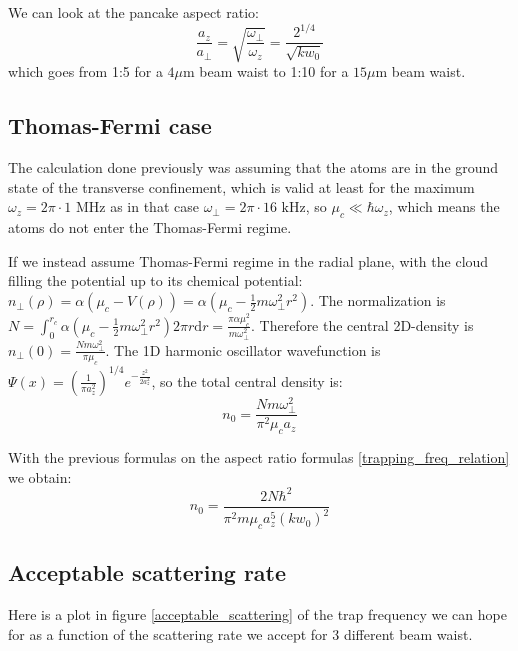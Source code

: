 \documentclass[reprint,amsmath,amssymb,aps,nofootinbib]{revtex4-1}
\begin{document}
We can look at the pancake aspect ratio:
\begin{equation}
\frac{a_{z}}{a_{\perp}}=\sqrt{\frac{\omega_{\perp}}{\omega_{z}}} = \frac{2^{1/4}}{\sqrt{kw_{0}}}
\end{equation}
which goes from 1:5 for a $4\mu$m beam waist to 1:10 for a $15\mu$m beam waist.

\subsection{Thomas-Fermi case}

The calculation done previously was assuming that the atoms are in the ground state of the transverse confinement, which is valid at least for the maximum $\omega_{z} = 2\pi\cdot 1\text{ MHz}$ as in that case $\omega_{\perp} = 2\pi\cdot 16\text{ kHz}$, so $\mu_{c} \ll \hbar\omega_{z}$, which means the atoms do not enter the Thomas-Fermi regime.

If we instead assume Thomas-Fermi regime in the radial plane, with the cloud filling the potential up to its chemical potential: $n_{\perp}(\rho)=\alpha(\mu_{c}-V(\rho))=\alpha(\mu_{c}-\frac{1}{2}m\omega_{\perp}^{2}r^{2})$. The normalization is $N = \int_{0}^{r_{c}}\alpha(\mu_{c}-\frac{1}{2}m\omega_{\perp}^{2}r^{2})2\pi r\text{d}r=\frac{\pi\alpha\mu_{c}^{2}}{m\omega_{\perp}^{2}}$. Therefore the central 2D-density is $n_{\perp}(0) = \frac{Nm\omega_{\perp}^{2}}{\pi\mu_{c}}$. The 1D harmonic oscillator wavefunction is $\Psi(x)=\left(\frac{1}{\pi a_{z}^{2}}\right)^{1/4}e^{-\frac{z^{2}}{2a_{z}^{2}}}$, so the total central density is:
\begin{equation}
n_{0} = \frac{Nm\omega_{\perp}^{2}}{\pi^{2}\mu_{c}a_{z}}
\end{equation}

With the previous formulas on the aspect ratio formulas \ref{trapping_freq_relation} we obtain:
\begin{equation}
n_{0} = \frac{2N\hbar^{2}}{\pi^{2}m\mu_{c}a_{z}^{5}(kw_{0})^{2}}
\end{equation}

\subsection{Acceptable scattering rate}

Here is a plot in figure \ref{acceptable_scattering} of the trap frequency we can hope for as a function of the scattering rate we accept for 3 different beam waist.
\end{document}

